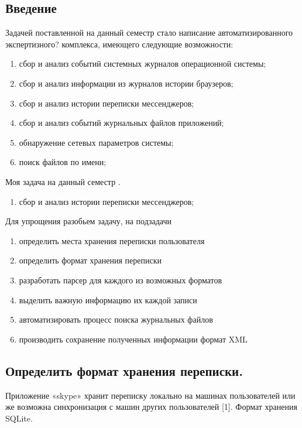 \newpage

\subsection{Введение}

Задачей поставленной на данный семестр стало написание автоматизированного экспертизного? комплекса, имеющего следующие возможности: 

\begin{enumerate}
\item сбор и анализ событий системных журналов операционной системы;
\item сбор и анализ информации из журналов истории браузеров;
\item сбор и анализ истории переписки мессенджеров;
\item сбор и анализ событий журнальных файлов приложений;
\item обнаружение сетевых параметров системы;
\item поиск файлов по имени;
\end{enumerate}

Моя задача на данный семестр . 

\begin{enumerate}
\item сбор и анализ истории переписки мессенджеров;
\end{enumerate}

Для упрощения разобьем задачу, на подзадачи
\begin{enumerate}
\item определить места хранения переписки пользователя
\item определить формат хранения переписки
\item разработать парсер для каждого из возможных форматов
\item выделить важную информацию их каждой записи
\item автоматизировать процесс поиска журнальных файлов
\item производить сохранение полученных информации формат XML
\end{enumerate}

\subsection{Определить формат хранения переписки.}

Приложение «skype» хранит переписку локально на машинах пользователей или же возможна синхронизация с машин других пользователей [1]. Формат хранения SQLite. 

